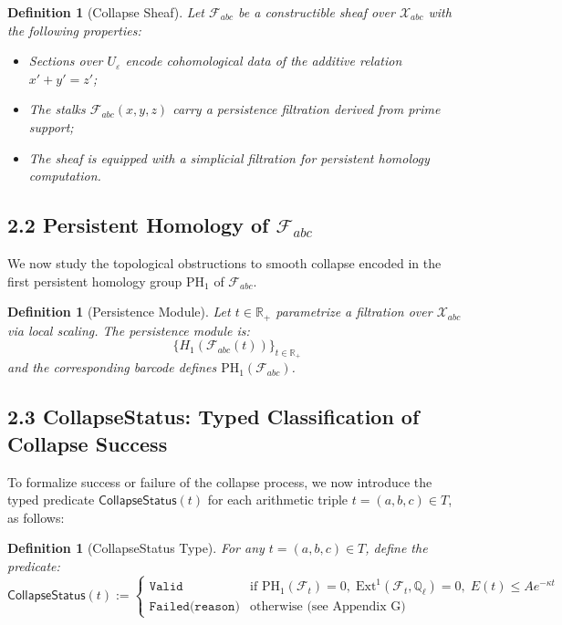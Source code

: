 \documentclass[11pt]{article}
\newtheorem{definition}[theorem]{Definition}
\begin{document}
\begin{definition}[Collapse Sheaf]
Let $\mathcal{F}_{abc}$ be a constructible sheaf over $\mathcal{X}_{abc}$ with the following properties:
\begin{itemize}
    \item Sections over $U_\varepsilon$ encode cohomological data of the additive relation $x'+y'=z'$;
    \item The stalks $\mathcal{F}_{abc}(x,y,z)$ carry a persistence filtration derived from prime support;
    \item The sheaf is equipped with a simplicial filtration for persistent homology computation.
\end{itemize}
\end{definition}

\subsection{2.2 Persistent Homology of $\mathcal{F}_{abc}$}

We now study the topological obstructions to smooth collapse encoded in the first persistent homology group $\mathrm{PH}_1$ of $\mathcal{F}_{abc}$.

\begin{definition}[Persistence Module]
Let $t \in \mathbb{R}_+$ parametrize a filtration over $\mathcal{X}_{abc}$ via local scaling. The persistence module is:
\[
\{ H_1(\mathcal{F}_{abc}(t)) \}_{t \in \mathbb{R}_+}
\]
and the corresponding barcode defines $\mathrm{PH}_1(\mathcal{F}_{abc})$.
\end{definition}

\subsection{2.3 CollapseStatus: Typed Classification of Collapse Success}

To formalize success or failure of the collapse process, we now introduce the typed predicate \( \mathsf{CollapseStatus}(t) \) for each arithmetic triple \( t = (a,b,c) \in T \), as follows:

\begin{definition}[CollapseStatus Type]
For any \( t = (a,b,c) \in T \), define the predicate:
\[
\mathsf{CollapseStatus}(t) :=
\begin{cases}
\texttt{Valid} & \text{if } \mathrm{PH}_1(\mathcal{F}_t) = 0,\; \mathrm{Ext}^1(\mathcal{F}_t, \mathbb{Q}_\ell) = 0,\; E(t) \leq A e^{-\kappa t} \\
\texttt{Failed(reason)} & \text{otherwise (see Appendix~G)}
\end{cases}
\]
\end{definition}
\end{document}
